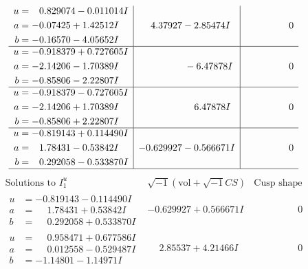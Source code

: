 \documentclass[1p]{elsarticle_modified}
\theoremstyle{definition}
\newcommand{\I}{\sqrt{-1}}
\begin{document}
$$\begin{array}{c|c|c}
\begin{aligned}
u &= \phantom{-}0.829074 - 0.011014 I \\
a &= -0.07425 + 1.42512 I \\
b &= -0.16570 - 4.05652 I\end{aligned}
 & \phantom{-}4.37927 - 2.85474 I & \phantom{-0.000000 } 0 \\ \hline\begin{aligned}
u &= -0.918379 + 0.727605 I \\
a &= -2.14206 - 1.70389 I \\
b &= -0.85806 - 2.22807 I\end{aligned}
 & \phantom{-0.000000 } -6.47878 I & \phantom{-0.000000 } 0 \\ \hline\begin{aligned}
u &= -0.918379 - 0.727605 I \\
a &= -2.14206 + 1.70389 I \\
b &= -0.85806 + 2.22807 I\end{aligned}
 & \phantom{-0.000000 -}6.47878 I & \phantom{-0.000000 } 0 \\ \hline\begin{aligned}
u &= -0.819143 + 0.114490 I \\
a &= \phantom{-}1.78431 - 0.53842 I \\
b &= \phantom{-}0.292058 - 0.533870 I\end{aligned}
 & -0.629927 - 0.566671 I & \phantom{-0.000000 } 0\\
 \hline 
 \end{array}$$\newpage$$\begin{array}{c|c|c}  
\text{Solutions to }I^u_{1}& \I (\text{vol} + \sqrt{-1}CS) & \text{Cusp shape}\\
 \hline 
\begin{aligned}
u &= -0.819143 - 0.114490 I \\
a &= \phantom{-}1.78431 + 0.53842 I \\
b &= \phantom{-}0.292058 + 0.533870 I\end{aligned}
 & -0.629927 + 0.566671 I & \phantom{-0.000000 } 0 \\ \hline\begin{aligned}
u &= \phantom{-}0.958471 + 0.677586 I \\
a &= \phantom{-}0.012558 - 0.529487 I \\
b &= -1.14801 - 1.14971 I\end{aligned}
 & \phantom{-}2.85537 + 4.21466 I & \phantom{-0.000000 } 0 \\ \hline\begin{aligned}

\end{aligned}
\end{array}$$
\end{document}
